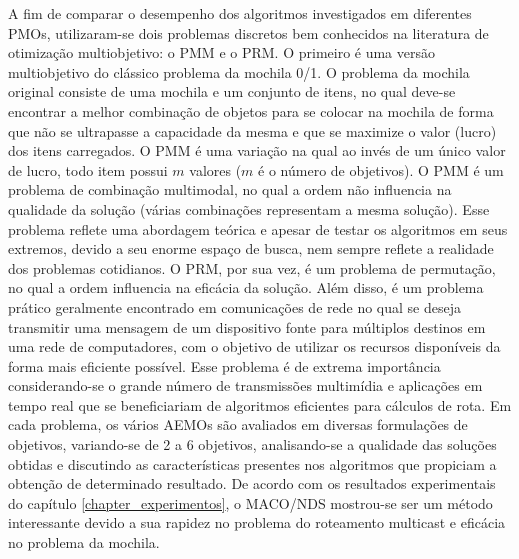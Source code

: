 A fim de comparar o desempenho dos algoritmos investigados em diferentes \acp{PMO}, utilizaram-se dois problemas discretos bem conhecidos na literatura de otimização multiobjetivo: o \ac{PMM} e o \ac{PRM}. O primeiro é uma versão multiobjetivo do clássico problema da mochila 0/1. O problema da mochila original consiste de uma mochila e um conjunto de itens, no qual deve-se encontrar a melhor combinação de objetos para se colocar na mochila de forma que não se ultrapasse a capacidade da mesma e que se maximize o valor (lucro) dos itens carregados. O PMM é uma variação na qual ao invés de um único valor de lucro, todo item possui $m$ valores ($m$ é o número de objetivos). O \ac{PMM} é um problema de combinação multimodal, no qual a ordem não influencia na qualidade da solução (várias combinações representam a mesma solução). Esse problema reflete uma abordagem teórica e apesar de testar os algoritmos em seus extremos, devido a seu enorme espaço de busca, nem sempre reflete a realidade dos problemas cotidianos. O \ac{PRM}, por sua vez, é um problema de permutação, no qual a ordem influencia na eficácia da solução. Além disso, é um problema prático geralmente encontrado em comunicações de rede no qual se deseja transmitir uma mensagem de um dispositivo fonte para múltiplos destinos em uma rede de computadores, com o objetivo de utilizar os recursos disponíveis da forma mais eficiente possível. Esse problema é de extrema importância considerando-se o grande número de transmissões multimídia e aplicações em tempo real que se beneficiariam de algoritmos eficientes para cálculos de rota. Em cada problema, os vários AEMOs são avaliados em diversas formulações de objetivos, variando-se de 2 a 6 objetivos, analisando-se a qualidade das soluções obtidas e discutindo as características presentes nos algoritmos que propiciam a obtenção de determinado resultado. De acordo com os resultados experimentais do capítulo \ref{chapter_experimentos}, o MACO/NDS mostrou-se ser um método interessante devido a sua rapidez no problema do roteamento multicast e eficácia no problema da mochila. 

